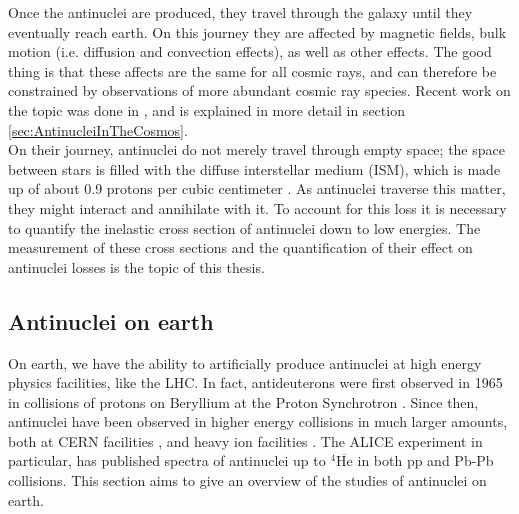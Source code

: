 Once the antinuclei are produced, they travel through the galaxy until they eventually reach earth. On this journey they are affected by magnetic fields, bulk motion (i.e. diffusion and convection effects), as well as other effects. The good thing is that these affects are the same for all cosmic rays, and can therefore be constrained by observations of more abundant cosmic ray species. Recent work on the topic was done in \cite{Boschini:2017fxq, Boschini:2018baj}, and is explained in more detail in section \ref{sec:AntinucleiInTheCosmos}. \\

On their journey, antinuclei do not merely travel through empty space; the space between stars is filled with the diffuse interstellar medium (ISM), which is made up of about 0.9 protons per cubic centimeter \cite{Ferri_re_2001}. As antinuclei traverse this matter, they might interact and annihilate with it. To account for this loss it is necessary to quantify the inelastic cross section of antinuclei down to low energies. The measurement of these cross sections and the quantification of their effect on antinuclei losses is the topic of this thesis. 
\subsection{Antinuclei on earth}
On earth, we have the ability to artificially produce antinuclei at high energy physics facilities, like the LHC. In fact, antideuterons were first observed in 1965 in collisions of protons on Beryllium at the Proton Synchrotron \cite{Massam:345976}. Since then, antinuclei have been observed in higher energy collisions in much larger amounts, both at CERN facilities \cite{nuclei_pp_13TeV, nuclei_pp_5TeV, nuclei_pp_PbPb, nuclei_pp}, and heavy ion facilities \cite{Ma_2013}. The ALICE experiment in particular, has published spectra of antinuclei up to $^4\overline{\mathrm{He}}$ \cite{nuclei_pp_13TeV, nuclei_pp_5TeV, nuclei_pp_PbPb, nuclei_pp} in both pp and Pb-Pb collisions. This section aims to give an overview of the studies of antinuclei on earth. 
